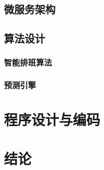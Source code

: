 \documentclass{ctexart}
\begin{document}
\subsection{微服务架构}
\subsection{算法设计}
\subsubsection{智能排班算法}
\subsubsection{预测引擎}

\section{程序设计与编码}

\section{结论}
\end{document}
